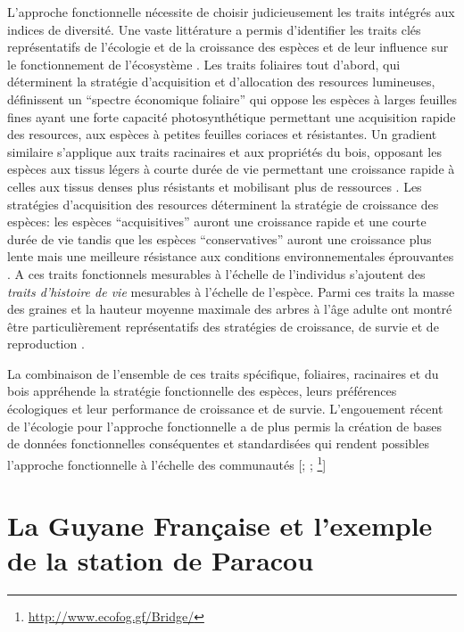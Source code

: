 \documentclass[
  11pt,
  french,
  A4paper,
  extrafontsizes,onecolumn,openright
  ]{memoir}
\begin{document}
L'approche fonctionnelle nécessite de choisir judicieusement les traits
intégrés aux indices de diversité. Une vaste littérature a permis
d'identifier les traits clés représentatifs de l'écologie et de la
croissance des espèces et de leur influence sur le fonctionnement de
l'écosystème \autocite{Reich2014}. Les traits foliaires tout d'abord,
qui déterminent la stratégie d'acquisition et d'allocation des resources
lumineuses, définissent un ``spectre économique foliaire'' qui oppose
les espèces à larges feuilles fines ayant une forte capacité
photosynthétique permettant une acquisition rapide des resources, aux
espèces à petites feuilles coriaces et résistantes. Un gradient
similaire s'applique aux traits racinaires et aux propriétés du bois,
opposant les espèces aux tissus légers à courte durée de vie permettant
une croissance rapide à celles aux tissus denses plus résistants et
mobilisant plus de ressources
\autocites{Chave2009}{Valverde-Barrantes2017}. Les stratégies
d'acquisition des resources déterminent la stratégie de croissance des
espèces: les espèces ``acquisitives'' auront une croissance rapide et
une courte durée de vie tandis que les espèces ``conservatives'' auront
une croissance plus lente mais une meilleure résistance aux conditions
environnementales éprouvantes \autocites{Reich1997}{Wright2004}. A ces
traits fonctionnels mesurables à l'échelle de l'individus s'ajoutent des
\emph{traits d'histoire de vie} mesurables à l'échelle de l'espèce.
Parmi ces traits la masse des graines et la hauteur moyenne maximale des
arbres à l'âge adulte ont montré être particulièrement représentatifs
des stratégies de croissance, de survie et de reproduction
\autocites{Westoby1998}{Herault2011}.

La combinaison de l'ensemble de ces traits spécifique, foliaires,
racinaires et du bois appréhende la stratégie fonctionnelle des espèces,
leurs préférences écologiques et leur performance de croissance et de
survie. L'engouement récent de l'écologie pour l'approche fonctionnelle
a de plus permis la création de bases de données fonctionnelles
conséquentes et standardisées qui rendent possibles l'approche
fonctionnelle à l'échelle des communautés {[}\textcite{Kattge2011};
\textcite{Perez-Harguindeguy2013}; \footnote{\url{http://www.ecofog.gf/Bridge/}}{]}

\section{La Guyane Française et l'exemple de la station de
Paracou}\label{la-guyane-francaise-et-lexemple-de-la-station-de-paracou}
\end{document}
